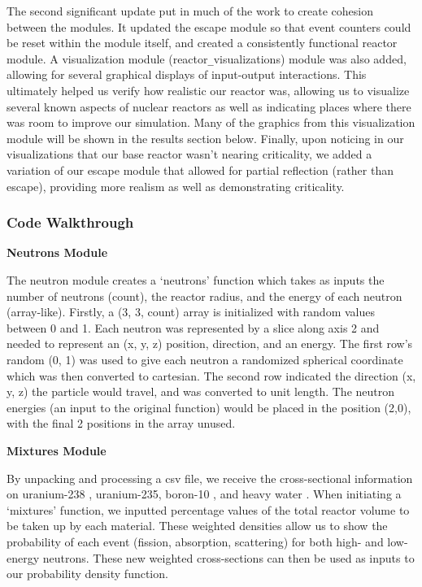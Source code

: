 \documentclass{notes}
\begin{document}
The second significant update put in much of the work to create cohesion between the modules. It updated the escape module so that event counters could be reset within the module itself, and created a consistently functional reactor module. A visualization module (reactor\verb|_|visualizations) module was also added, allowing for several graphical displays of input-output interactions. This ultimately helped us verify how realistic our reactor was, allowing us to visualize several known aspects of nuclear reactors as well as indicating places where there was room to improve our simulation. Many of the graphics from this visualization module will be shown in the results section below. Finally, upon noticing in our visualizations that our base reactor wasn't nearing criticality, we added a variation of our escape module that allowed for partial reflection (rather than escape), providing more realism as well as demonstrating criticality.

\subsubsection*{Code Walkthrough}

\textbf{Neutrons Module}

The neutron module creates a `neutrons' function which takes as inputs the number of neutrons (count), the reactor radius, and the energy of each neutron (array-like). Firstly, a (3, 3, count) array is initialized with random values between 0 and 1. Each neutron was represented by a slice along axis 2 and needed to represent an (x, y, z) position, direction, and an energy. The first row's random (0, 1) was used to give each neutron a randomized spherical coordinate which was then converted to cartesian. The second row indicated the direction (x, y, z) the particle would travel, and was converted to unit length. The neutron energies (an input to the original function) would be placed in the position (2,0), with the final 2 positions in the array unused.

\textbf{Mixtures Module}

By unpacking and processing a csv file, we receive the cross-sectional information on uranium-238 \cite{Kim, Andersen}, uranium-235, boron-10 \cite{Bogart}, and heavy water \cite{CrossSections}. When initiating a `mixtures' function, we inputted percentage values of the total reactor volume to be taken up by each material. These weighted densities allow us to show the probability of each event (fission, absorption, scattering) for both high- and low-energy neutrons. These new weighted cross-sections can then be used as inputs to our probability density function.
\end{document}
